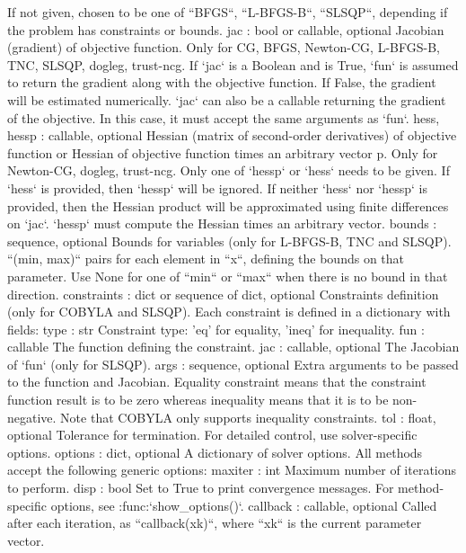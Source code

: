 \begin{DoxyVerb}
    If not given, chosen to be one of ``BFGS``, ``L-BFGS-B``, ``SLSQP``,
    depending if the problem has constraints or bounds.
jac : bool or callable, optional
    Jacobian (gradient) of objective function. Only for CG, BFGS,
    Newton-CG, L-BFGS-B, TNC, SLSQP, dogleg, trust-ncg.
    If `jac` is a Boolean and is True, `fun` is assumed to return the
    gradient along with the objective function. If False, the
    gradient will be estimated numerically.
    `jac` can also be a callable returning the gradient of the
    objective. In this case, it must accept the same arguments as `fun`.
hess, hessp : callable, optional
    Hessian (matrix of second-order derivatives) of objective function or
    Hessian of objective function times an arbitrary vector p.  Only for
    Newton-CG, dogleg, trust-ncg.
    Only one of `hessp` or `hess` needs to be given.  If `hess` is
    provided, then `hessp` will be ignored.  If neither `hess` nor
    `hessp` is provided, then the Hessian product will be approximated
    using finite differences on `jac`. `hessp` must compute the Hessian
    times an arbitrary vector.
bounds : sequence, optional
    Bounds for variables (only for L-BFGS-B, TNC and SLSQP).
    ``(min, max)`` pairs for each element in ``x``, defining
    the bounds on that parameter. Use None for one of ``min`` or
    ``max`` when there is no bound in that direction.
constraints : dict or sequence of dict, optional
    Constraints definition (only for COBYLA and SLSQP).
    Each constraint is defined in a dictionary with fields:
        type : str
            Constraint type: 'eq' for equality, 'ineq' for inequality.
        fun : callable
            The function defining the constraint.
        jac : callable, optional
            The Jacobian of `fun` (only for SLSQP).
        args : sequence, optional
            Extra arguments to be passed to the function and Jacobian.
    Equality constraint means that the constraint function result is to
    be zero whereas inequality means that it is to be non-negative.
    Note that COBYLA only supports inequality constraints.
tol : float, optional
    Tolerance for termination. For detailed control, use solver-specific
    options.
options : dict, optional
    A dictionary of solver options. All methods accept the following
    generic options:
        maxiter : int
            Maximum number of iterations to perform.
        disp : bool
            Set to True to print convergence messages.
    For method-specific options, see :func:`show_options()`.
callback : callable, optional
    Called after each iteration, as ``callback(xk)``, where ``xk`` is the
    current parameter vector.


\end{DoxyVerb}

